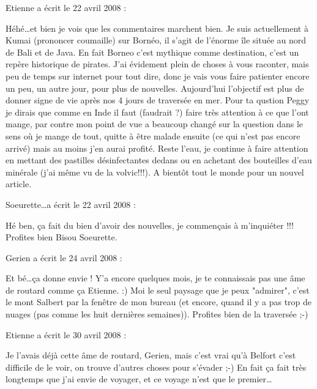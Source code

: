 \medskip
Etienne a écrit le 22 avril 2008 :
\begin{displayquote}
Héhé\dots et bien je vois que les commentaires marchent bien.
Je suis actuellement à Kumai (prononcer coumaille) sur Bornéo, il s'agit de l'énorme île située au nord de Bali et de Java.
En fait Borneo c'est mythique comme destination, c'est un repère historique de pirates.
J'ai évidement plein de choses à vous raconter, mais peu de temps sur internet pour tout dire, donc je vais vous faire patienter encore un peu, un autre jour, pour plus de nouvelles. Aujourd'hui l'objectif est plus de donner signe de vie après nos 4 jours de traversée en mer.
Pour ta qustion Peggy je dirais que comme en Inde il faut (faudrait ?) faire très attention à ce que l'ont mange, par contre mon point de vue a beaucoup changé sur la question dans le sens où je mange de tout, quitte à être malade ensuite (ce qui n'est pas encore arrivé) mais au moins j'en aurai profité. Reste l'eau, je continue à faire attention en mettant des pastilles désinfectantes dedans ou en achetant des bouteilles d'eau minérale (j'ai même vu de la volvic!!!).
A bientôt tout le monde pour un nouvel article.
\end{displayquote}

\medskip
Soeurette\dots a écrit le 22 avril 2008 :
\begin{displayquote}
Hé ben, ça fait du bien d'avoir des nouvelles, je commençais à m'inquiéter !!!
Profites bien
Bisou
Soeurette.
\end{displayquote}

\medskip
Gerien a écrit le 24 avril 2008 :
\begin{displayquote}
Et bé\dots ça donne envie !
Y'a encore quelques mois, je te connaissais pas une âme de routard comme ça Etienne. :)
Moi le seul paysage que je peux "admirer", c'est le mont Salbert par la fenêtre de mon bureau (et encore, quand il y a pas trop de nuages (pas comme les huit dernières semaines)).
Profites bien de la traversée ;-)
\end{displayquote}

\medskip
Etienne a écrit le 30 avril 2008 :
\begin{displayquote}
Je l'avais déjà cette âme de routard, Gerien, mais c'est vrai qu'à Belfort c'est difficile de le voir, on trouve d'autres choses pour s'évader ;-) En fait ça fait très longtemps que j'ai envie de voyager, et ce voyage n'est que le premier\dots
\end{displayquote}

\vfill
